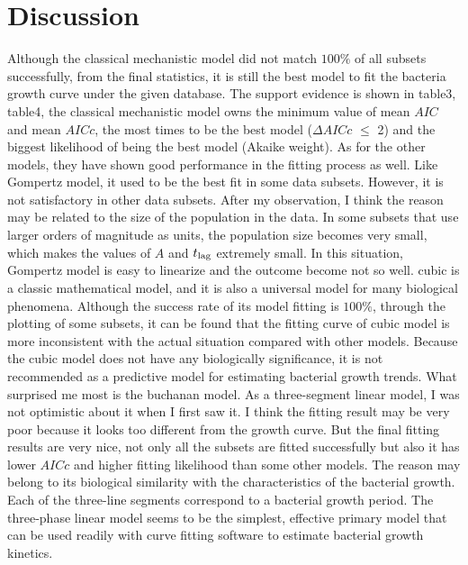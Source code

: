 \documentclass[11pt]{article}
\begin{document}
\section{Discussion}
Although the classical mechanistic model did not match $100\%$ of all subsets successfully, from the final statistics, it is still the best model to fit the bacteria growth curve under the given database. The support evidence is shown in table3, table4, the classical mechanistic model owns the minimum value of mean $AIC$ and mean $AICc$, the most times to be the best model ($\Delta$$AICc$ $\leq$ 2) and the biggest likelihood of being the best model (Akaike weight)\citep{sakamoto1986akaike}. As for the other models, they have shown good performance in the fitting process as well. Like Gompertz model, it used to be the best fit in some data subsets. However, it is not satisfactory in other data subsets. After my observation, I think the reason may be related to the size of the population in the data. In some subsets that use larger orders of magnitude as units, the population size becomes very small, which makes the values of $A$ and $t\textsubscript{lag}$ extremely small. In this situation, Gompertz model is easy to linearize and the outcome become not so well. cubic is a classic mathematical model, and it is also a universal model for many biological phenomena. Although the success rate of its model fitting is $100\%$, through the plotting of some subsets, it can be found that the fitting curve of cubic model is more inconsistent with the actual situation compared with other models. Because the cubic model does not have any biologically significance\citep{brunner2006matrix}, it is not recommended as a predictive model for estimating bacterial growth trends. What surprised me most is the buchanan model. As a three-segment linear model, I was not optimistic about it when I first saw it. I think the fitting result may be very poor because it looks too different from the growth curve. But the final fitting results are very nice, not only all the subsets are fitted successfully but also it has lower $AICc$ and higher fitting likelihood than some other models. The reason may belong to its biological similarity with the characteristics of the bacterial growth. Each of the three-line segments correspond to a bacterial growth period. The three-phase linear model seems to be the simplest, effective primary model that can be used readily with curve fitting software to estimate bacterial growth kinetics\citep{buchanan1997simple}.



    
\end{document}
